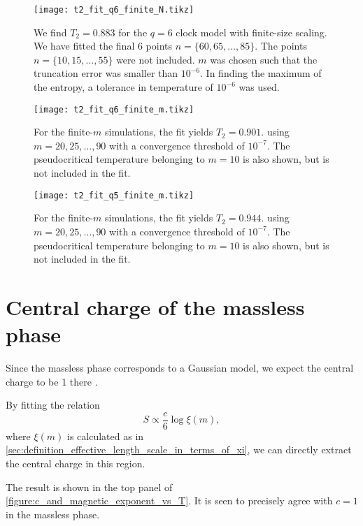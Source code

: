 \begin{figure}
  \centering
  \texttt{[image: t2\_fit\_q6\_finite\_N.tikz]}
  \caption{We find $T_2 = 0.883$ for the $q = 6$ clock model with finite-size scaling.
  We have fitted the final 6 points $n = \{ 60, 65, \dots, 85 \}$.
  The points $n = \{ 10, 15, \dots, 55 \}$ were not included.
  $m$ was chosen such that the truncation error was smaller than $10^{-6}$.
  In finding the maximum of the entropy, a tolerance in temperature of $10^{-6}$ was used.}
  \label{figure:t2_fit_q6_finite_N}
\end{figure}

\begin{figure}
  \centering
  \texttt{[image: t2\_fit\_q6\_finite\_m.tikz]}
  \caption{
  For the finite-$m$ simulations, the fit yields $T_2 = 0.901$.
  using $m = 20, 25, \dots,
  90$ with a convergence threshold of $10^{-7}$.
  The pseudocritical temperature belonging to $m = 10$ is also shown,
  but is not included in the fit.}\label{figure:t2_fit_q6_finite_m}
\end{figure}

\begin{figure}
  \centering
  \texttt{[image: t2\_fit\_q5\_finite\_m.tikz]}
  \caption{
  For the finite-$m$ simulations, the fit yields $T_2 = 0.944$.
  using $m = 20, 25, \dots,
  90$ with a convergence threshold of $10^{-7}$.
  The pseudocritical temperature belonging to $m = 10$ is also shown,
  but is not included in the fit.}\label{figure:t2_fit_q5_finite_m}
\end{figure}

\section{Central charge of the massless phase}
Since the massless phase corresponds to a Gaussian model, we expect the central charge to be 1 there
\cite{kosterlitz1974critical}.

By fitting the relation
\begin{equation}\label{eq:entropy_as_function_of_xi2}
  S \propto \frac{c}{6} \log \xi(m),
\end{equation}
where $\xi(m)$ is calculated as in \autoref{sec:definition_effective_length_scale_in_terms_of_xi},
we can directly extract the central charge in this region.

The result is shown in the top panel of \autoref{figure:c_and_magnetic_exponent_vs_T}.
It is seen to precisely agree with $c = 1$ in the massless phase.

